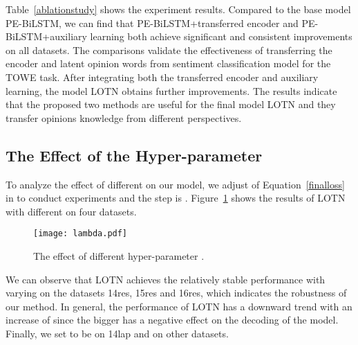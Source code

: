 \documentclass[letterpaper]{article} \usepackage{aaai20}  \usepackage{times}  \usepackage{helvet} \usepackage{courier}  \usepackage[hyphens]{url}  \usepackage{graphicx} \urlstyle{rm} \def\UrlFont{\rm}  \usepackage{graphicx}
\begin{document}
Table~\ref{ablationstudy} shows the experiment results. Compared to the base model PE-BiLSTM, we can find that PE-BiLSTM+transferred encoder and PE-BiLSTM+auxiliary learning both achieve significant and consistent improvements on all datasets. The comparisons validate the effectiveness of transferring the encoder and latent opinion words from sentiment classification model for the TOWE task. After integrating both the transferred encoder and auxiliary learning, the model LOTN obtains further improvements. The results indicate that the proposed two methods are useful for the final model LOTN and they transfer opinions knowledge from different perspectives.

\subsection{The Effect of the Hyper-parameter }
\noindent To analyze the effect of different  on our model, we adjust  of Equation~\ref{finalloss} in  to conduct experiments and the step is . Figure~\ref{hyperparameter} shows the results of LOTN with different  on four datasets.
\begin{figure}[ht]
	\centering
	\texttt{[image: lambda.pdf]}
	\caption{The effect of different hyper-parameter .}
	\label{hyperparameter}
\end{figure}

We can observe that LOTN achieves the relatively stable performance with varying  on the datasets 14res, 15res and 16res, which indicates the robustness of our method. In general, the performance of LOTN has a downward trend with an increase of  since the bigger  has a negative effect on the decoding of the model. Finally, we set  to be  on 14lap and  on other datasets.
\end{document}
